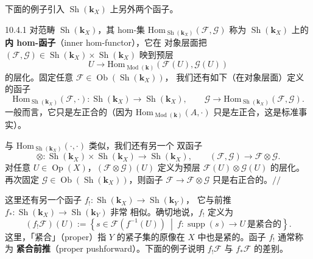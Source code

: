 下面的例子引入 $\operatorname{Sh}(\mathbf{k}_X)$ 上另外两个函子。

\begin{wexam}{10.4.1}
对范畴 $\operatorname{Sh}(\mathbf{k}_X)$，其 hom-集
$\mathrm{Hom}_{\operatorname{Sh}(\mathbf{k}_X)}(\mathcal F,\mathcal G)$ 称为
$\operatorname{Sh}(\mathbf{k}_X)$ 上的\textbf{内 hom-函子}（inner hom-functor），它在
对象层面把
$(\mathcal F,\mathcal G)\in\operatorname{Sh}(\mathbf{k}_X)\times
\operatorname{Sh}(\mathbf{k}_X)$ 映到预层
\[
U\to\mathrm{Hom}_{\operatorname{Mod}(\mathbf{k})}(\mathcal F(U),\mathcal G(U))
\]
的层化。固定任意 $\mathcal F\in\operatorname{Ob}(\operatorname{Sh}(\mathbf{k}_X))$，
我们还有如下（在对象层面）定义的函子
\[
\mathrm{Hom}_{\operatorname{Sh}(\mathbf{k}_X)}(\mathcal F,\cdot):
\operatorname{Sh}(\mathbf{k}_X)\to\operatorname{Sh}(\mathbf{k}_X),\qquad
\mathcal G\to\mathrm{Hom}_{\operatorname{Sh}(\mathbf{k}_X)}(\mathcal F,\mathcal G).
\]
一般而言，它只是左正合的（因为 $\mathrm{Hom}_{\operatorname{Mod}(\mathbf{k})}(A,\cdot)$
只是左正合，这是标准事实）。
\end{wexam}

与 $\mathrm{Hom}_{\operatorname{Sh}(\mathbf{k}_X)}(\cdot,\cdot)$ 类似，我们还有另一个
双函子
\[
\otimes:\operatorname{Sh}(\mathbf{k}_X)\times\operatorname{Sh}(\mathbf{k}_X)
\to\operatorname{Sh}(\mathbf{k}_X),\qquad
(\mathcal F,\mathcal G)\to\mathcal F\otimes\mathcal G.
\]
对任意 $U\in\operatorname{Op}(X)$，$(\mathcal F\otimes\mathcal G)(U)$ 定义为预层
$\mathcal F(U)\otimes\mathcal G(U)$ 的层化。再次固定
$\mathcal G\in\operatorname{Ob}(\operatorname{Sh}(\mathbf{k}_X))$，则函子
$\mathcal F\to\mathcal F\otimes\mathcal G$ 只是右正合的。\hfill$//$

这里还有另一个函子 $f_!:\operatorname{Sh}(\mathbf{k}_X)\to\operatorname{Sh}(\mathbf{k}_Y)$，
它与前推 $f_\ast:\operatorname{Sh}(\mathbf{k}_X)\to\operatorname{Sh}(\mathbf{k}_Y)$ 非常
相似。确切地说，$f_!$ 定义为
\begin{equation}\tag{10.19}
(f_!\mathcal F)(U):=
\left\{s\in\mathcal F(f^{-1}(U))\ \middle|\
f:\operatorname{supp}(s)\to U\ \text{是紧合的}\right\}.
\end{equation}
这里，「紧合」（proper）指 $Y$ 的紧子集的原像在 $X$ 中也是紧的。函子 $f_!$ 通常称为
\textbf{紧合前推}（proper pushforward）。下面的例子说明 $f_!\mathcal F$ 与
$f_\ast\mathcal F$ 的差别。

